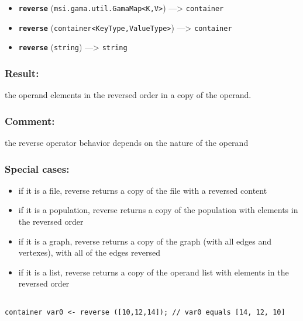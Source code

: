 \documentclass[]{book}
\providecommand{\tightlist}{%
  \setlength{\itemsep}{0pt}\setlength{\parskip}{0pt}}
\theoremstyle{definition}
\theoremstyle{definition}
\theoremstyle{definition}
\theoremstyle{remark}
\begin{document}
\begin{itemize}
\tightlist
\item
  \textbf{\texttt{reverse}}
  (\texttt{msi.gama.util.GamaMap\textless{}K,V\textgreater{}})
  ---\textgreater{} \texttt{container}
\item
  \textbf{\texttt{reverse}}
  (\texttt{container\textless{}KeyType,ValueType\textgreater{}})
  ---\textgreater{} \texttt{container}
\item
  \textbf{\texttt{reverse}} (\texttt{string}) ---\textgreater{}
  \texttt{string}
\end{itemize}

\subsubsection{Result:}\label{result-421}

the operand elements in the reversed order in a copy of the operand.

\subsubsection{Comment:}\label{comment-83}

the reverse operator behavior depends on the nature of the operand

\subsubsection{Special cases:}\label{special-cases-117}

\begin{itemize}
\tightlist
\item
  if it is a file, reverse returns a copy of the file with a reversed
  content\\
\item
  if it is a population, reverse returns a copy of the population with
  elements in the reversed order\\
\item
  if it is a graph, reverse returns a copy of the graph (with all edges
  and vertexes), with all of the edges reversed\\
\item
  if it is a list, reverse returns a copy of the operand list with
  elements in the reversed order
\end{itemize}

\begin{verbatim}
 
container var0 <- reverse ([10,12,14]); // var0 equals [14, 12, 10]
\end{verbatim}
\end{document}
